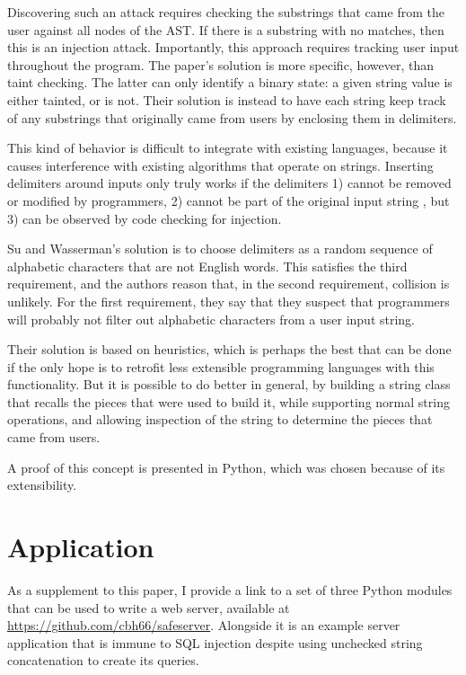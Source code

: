 \documentclass[twocolumn]{article}
\begin{document}
Discovering such an attack requires checking the substrings that came from the user against all nodes of the AST.  If there is a substring with no matches, then this is an injection attack.  Importantly, this approach requires tracking user input throughout the program.  The paper's solution is more specific, however, than taint checking.  The latter can only identify a binary state: a given string value is either tainted, or is not. Their solution is instead to have each string keep track of any substrings that originally came from users by enclosing them in delimiters.

This kind of behavior is difficult to integrate with existing languages, because it causes interference with existing algorithms that operate on strings.  Inserting delimiters around inputs only truly works if the delimiters 1) cannot be removed or modified by programmers, 2) cannot be part of the original input string , but 3) can be observed by code checking for injection.

Su and Wasserman's solution is to choose delimiters as a random sequence of alphabetic characters that are not English words.  This satisfies the third requirement, and the authors reason that, in the second requirement, collision is unlikely.  For the first requirement, they say that they suspect that programmers will probably not filter out alphabetic characters from a user input string.\cite{su2006}

Their solution is based on heuristics, which is perhaps the best that can be done if the only hope is to retrofit less extensible programming languages with this functionality.   But it is possible to do better in general, by building a string class that recalls the pieces that were used to build it, while supporting normal string operations, and allowing inspection of the string to determine the pieces that came from users.

A proof of this concept is presented in Python, which was chosen because of its extensibility.


\section{Application}
As a supplement to this paper, I provide a link to a set of three Python modules that can be used to write a web server, available at \url{https://github.com/cbh66/safeserver}.  Alongside it is an example server application that is immune to SQL injection despite using unchecked string concatenation to create its queries.
\end{document}
